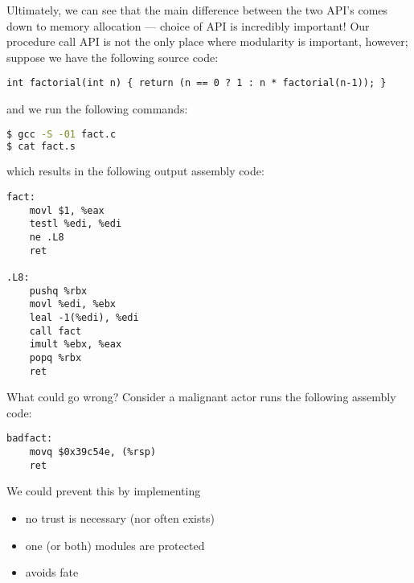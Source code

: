 \documentclass[../../lecture_notes.tex]{subfiles}
\begin{document}
Ultimately, we can see that the main difference between the two API's comes down to memory allocation --- choice of API is incredibly important! Our procedure call API is not the only place where modularity is important, however; suppose we have the following source code:
\begin{lstlisting}
int factorial(int n) { return (n == 0 ? 1 : n * factorial(n-1)); }
\end{lstlisting}
and we run the following commands:
\begin{lstlisting}[language=sh, 	keywordstyle=\color{black}]
$ gcc -S -01 fact.c
$ cat fact.s
\end{lstlisting}
which results in the following output assembly code:
\begin{lstlisting}
fact:
	movl $1, %eax
	testl %edi, %edi
	ne .L8
	ret

.L8:
	pushq %rbx
	movl %edi, %ebx
 	leal -1(%edi), %edi
	call fact
	imult %ebx, %eax
	popq %rbx
	ret
\end{lstlisting}
What could go wrong? Consider a malignant actor runs the following assembly code:
\begin{lstlisting}
badfact:
	movq $0x39c54e, (%rsp)
	ret
\end{lstlisting}

We could prevent this by implementing
\begin{itemize}
\item no trust is necessary (nor often exists)
\item one (or both) modules are protected
\item avoids fate
\end{itemize}
\end{document}
